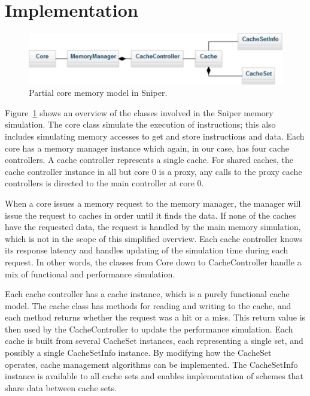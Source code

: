 \section{Implementation}
\label{sec:framework:implementation}

\begin{figure}[ht]
\centering
\includegraphics[scale=0.7]{figures/framework/functional_core_model}
\caption{Partial core memory model in Sniper.}
\label{fig:framework:implementation:core_memory}
\end{figure}

Figure~\ref{fig:framework:implementation:core_memory} shows an overview of the classes involved in the Sniper memory simulation.
The core class simulate the execution of instructions; this also includes simulating memory accesses to get and store instructions and data.
Each core has a memory manager instance which again, in our case, has four cache controllers.
A cache controller represents a single cache.
For shared caches, the cache controller instance in all but core 0 is a proxy, any calls to the proxy cache controllers is directed to the main controller at core 0.

When a core issues a memory request to the memory manager, the manager will issue the request to caches in order until it finds the data. 
If none of the caches have the requested data, the request is handled by the main memory simulation, which is not in the scope of this simplified overview.
Each cache controller knows its response latency and handles updating of the simulation time during each request.
In other words, the classes from Core down to CacheController handle a mix of functional and performance simulation.

Each cache controller has a cache instance, which is a purely functional cache model.
The cache class has methods for reading and writing to the cache, and each method returns whether the request was a hit or a miss.
This return value is then used by the CacheController to update the performance simulation.
Each cache is built from several CacheSet instances, each representing a single set, and possibly a single CacheSetInfo instance.
By modifying how the CacheSet operates, cache management algorithms can be implemented.
The CacheSetInfo instance is available to all cache sets and enables implementation of schemes that share data between cache sets.

